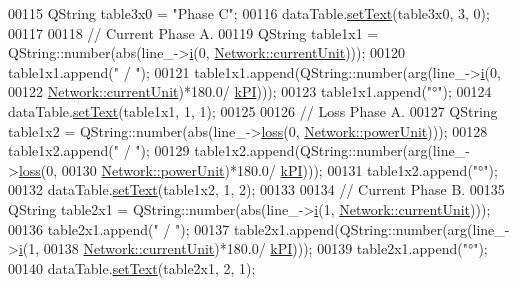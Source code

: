 \begin{DoxyCode}
00115   QString table3x0 = \textcolor{stringliteral}{"Phase C"};
00116   dataTable.\hyperlink{class_data_table_aee0d28c77116b51360f0124a529cb3ff}{setText}(table3x0, 3, 0);
00117 
00118   \textcolor{comment}{// Current Phase A.}
00119   QString table1x1 = QString::number(abs(line\_->\hyperlink{group___models_gaf81e7055102816465bdf7e19afc2d547}{i}(0, \hyperlink{group___graphics_gac6a26db5fef2b1dd2a00faf6340d1702}{Network::currentUnit})));
00120   table1x1.append(\textcolor{stringliteral}{" / "});
00121   table1x1.append(QString::number(arg(line\_->\hyperlink{group___models_gaf81e7055102816465bdf7e19afc2d547}{i}(0,
00122                                       \hyperlink{group___graphics_gac6a26db5fef2b1dd2a00faf6340d1702}{Network::currentUnit})*180.0/
      \hyperlink{math__constants_8h_a368d99984512d9a6c6f18b37b4446431}{kPI})));
00123   table1x1.append(\textcolor{stringliteral}{"°"});
00124   dataTable.\hyperlink{class_data_table_aee0d28c77116b51360f0124a529cb3ff}{setText}(table1x1, 1, 1);
00125 
00126   \textcolor{comment}{// Loss Phase A.}
00127   QString table1x2 = QString::number(abs(line\_->\hyperlink{group___models_ga7909d69e419de3f460ca7abab3d91e53}{loss}(0, \hyperlink{group___graphics_ga9504015bc566f4a3d3b4d4a86000293b}{Network::powerUnit})));
00128   table1x2.append(\textcolor{stringliteral}{" / "});
00129   table1x2.append(QString::number(arg(line\_->\hyperlink{group___models_ga7909d69e419de3f460ca7abab3d91e53}{loss}(0,
00130                                       \hyperlink{group___graphics_ga9504015bc566f4a3d3b4d4a86000293b}{Network::powerUnit})*180.0/
      \hyperlink{math__constants_8h_a368d99984512d9a6c6f18b37b4446431}{kPI})));
00131   table1x2.append(\textcolor{stringliteral}{"°"});
00132   dataTable.\hyperlink{class_data_table_aee0d28c77116b51360f0124a529cb3ff}{setText}(table1x2, 1, 2);
00133 
00134   \textcolor{comment}{// Current Phase B.}
00135   QString table2x1 = QString::number(abs(line\_->\hyperlink{group___models_gaf81e7055102816465bdf7e19afc2d547}{i}(1, \hyperlink{group___graphics_gac6a26db5fef2b1dd2a00faf6340d1702}{Network::currentUnit})));
00136   table2x1.append(\textcolor{stringliteral}{" / "});
00137   table2x1.append(QString::number(arg(line\_->\hyperlink{group___models_gaf81e7055102816465bdf7e19afc2d547}{i}(1,
00138                                       \hyperlink{group___graphics_gac6a26db5fef2b1dd2a00faf6340d1702}{Network::currentUnit})*180.0/
      \hyperlink{math__constants_8h_a368d99984512d9a6c6f18b37b4446431}{kPI})));
00139   table2x1.append(\textcolor{stringliteral}{"°"});
00140   dataTable.\hyperlink{class_data_table_aee0d28c77116b51360f0124a529cb3ff}{setText}(table2x1, 2, 1);

\end{DoxyCode}

